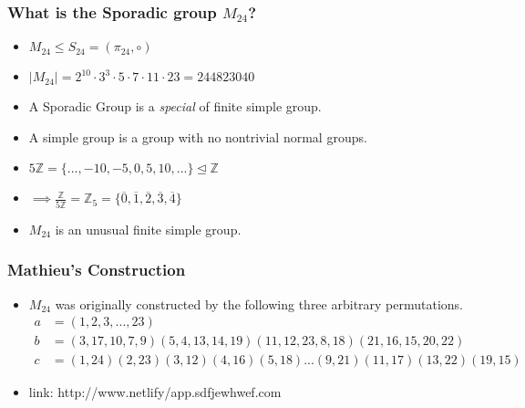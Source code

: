 \documentclass{beamer}
\begin{document}
\begin{frame}
    \frametitle{What is the Sporadic group \( M_{24} \)?}
    \begin{itemize}
        \item<2-> \( M_{24} \le S_{24} = (\pi_{24}, \circ) \)
    \item<4-> \( |M_{24}| = 2^{10} \cdot 3^3 \cdot 5 \cdot 7 \cdot 11 \cdot 23 = 244823040 \)
        \bigbreak
    \item<5-> A Sporadic Group is a \textit{special} of finite simple group.
    \item<6-> A simple group is a group with no nontrivial normal groups.
    \item<7-> 
        \begin{example}
        \end{example}
        \( 5\mathbb{Z} = \{..., -10, -5, 0, 5, 10, ...\} \unlhd \mathbb{Z} \)
    \item<8-> \( \implies \frac{\mathbb{Z}}{5\mathbb{Z}} 
            = \mathbb{Z}_5
            = \{ \overline{0}, \overline{1}, \overline{2}, \overline{3}, \overline{4} \}\)
            \bigbreak
        \item<9-> \( M_{24} \) is an unusual finite simple group.
    \end{itemize}
\end{frame}

\begin{frame}
    \frametitle{Mathieu's Construction}
    \begin{itemize}
        \item<1->\( M_{24} \) was originally constructed by the following three arbitrary
            permutations.
            \footnotesize{
            \begin{align*}
                a &= (1,2,3,...,23) \\
                b &= (3,17,10,7,9)(5,4,13,14,19)(11,12,23,8,18)(21,16,15,20,22) \\
                c &= (1,24)(2,23)(3,12)(4,16)(5,18)...(9,21)(11,17)(13,22)(19,15)
            \end{align*}
        }%
    \item<2-> link: http://www.netlify/app.sdfjewhwef.com
    \end{itemize}
\end{frame}
\end{document}
